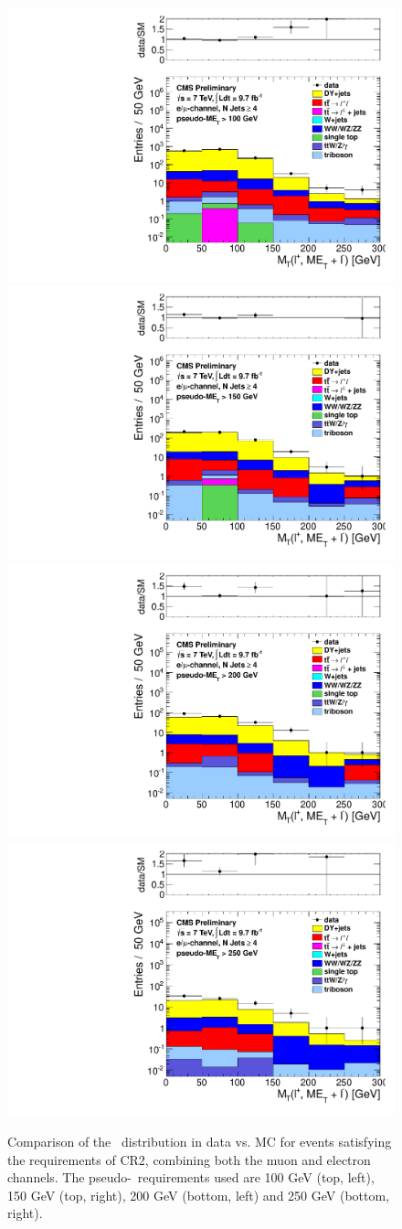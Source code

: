 \begin{figure}[hbt]
  \begin{center}
	\includegraphics[width=0.5\linewidth]{plots/CR2plots/mt_lepcor_scaled_met100_nj4_emucomb.pdf}%
	\includegraphics[width=0.5\linewidth]{plots/CR2plots/mt_lepcor_scaled_met150_nj4_emucomb.pdf}
	\includegraphics[width=0.5\linewidth]{plots/CR2plots/mt_lepcor_scaled_met200_nj4_emucomb.pdf}%
	\includegraphics[width=0.5\linewidth]{plots/CR2plots/mt_lepcor_scaled_met250_nj4_emucomb.pdf}
    \caption{
      Comparison of the \mt\ distribution in data vs. MC for events
      satisfying the requirements of CR2, combining both the muon and
      electron channels. The pseudo-\met\ requirements used are
      100 GeV (top, left), 150 GeV (top, right), 200 GeV (bottom,
      left) and 250 GeV (bottom, right).
\label{fig:cr2mtrest} 
}  
      \end{center}
\end{figure}
